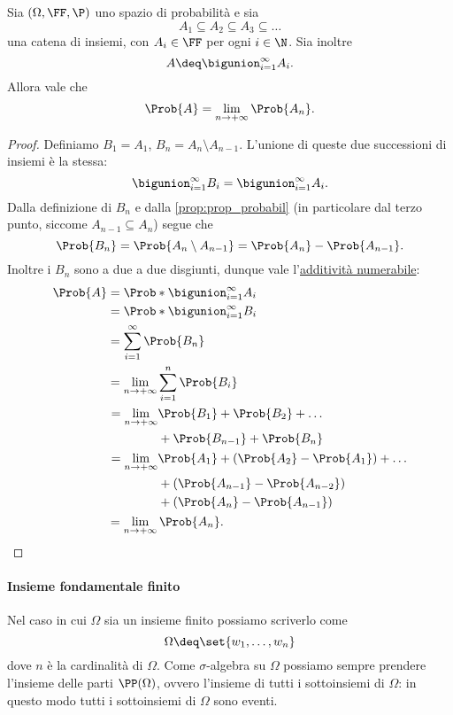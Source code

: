 \begin{proposition}
    Sia $(\Omega, \FF, \P)$ uno spazio di probabilità e sia \[
        A_1 \subseteq A_2 \subseteq A_3 \subseteq \dots    
    \] una catena di insiemi, con $A_i \in \FF$ per ogni $i \in \N$. Sia inoltre \[
        A \deq \bigunion_{i=1}^\infty A_i.    
    \] Allora vale che \begin{equation}
        \Prob{A} = \lim_{n \to +\infty} \Prob{A_n}.
    \end{equation}
\end{proposition}
\begin{proof}
    Definiamo $B_1 = A_1$, $B_n = A_n \setminus A_{n-1}$. L'unione di queste due successioni di insiemi è la stessa: \[
        \bigunion_{i=1}^\infty B_i = \bigunion_{i=1}^\infty A_i.    
    \] Dalla definizione di $B_n$ e dalla \autoref{prop:prop_probabil} (in particolare dal terzo punto, siccome $A_{n-1} \subseteq A_n$) segue che \[
        \Prob{B_n} = \Prob{A_n \setminus A_{n-1}} = \Prob{A_n} - \Prob{A_{n-1}}.
    \] Inoltre i $B_n$ sono a due a due disgiunti, dunque vale l'\hyperref[def:prob_numerab_add]{additività numerabile}: \begin{align*}
        \Prob{A} &= \Prob*{\bigunion_{i=1}^\infty A_i} \\
        &= \Prob*{\bigunion_{i=1}^\infty B_i}\\
        &= \sum_{i=1}^\infty \Prob{B_n}\\
        &= \lim_{n\to +\infty} \sum_{i=1}^n \Prob{B_i}\\
        &\begin{aligned}
            \ = \lim_{n \to +\infty} &\Prob{B_1} + \Prob{B_2} + \dots \\
            &+ \Prob{B_{n-1}} + \Prob{B_n}\\
        \end{aligned}\\
        &\begin{aligned}
            \ = \lim_{n \to +\infty} &\Prob{A_1} + (\Prob{A_2} - \Prob{A_1}) + \dots\\
            &+ (\Prob{A_{n-1}} - \Prob{A_{n-2}})\\
            &+ (\Prob{A_{n}} - \Prob{A_{n-1}})
        \end{aligned}\\
        &= \lim_{n \to +\infty} \Prob{A_n}. \qedhere
    \end{align*}
\end{proof}

\paragraph{Insieme fondamentale finito} Nel caso in cui $\Omega$ sia un insieme finito possiamo scriverlo come \[
    \Omega \deq \set{w_1, \dots, w_n}    
\] dove $n$ è la cardinalità di $\Omega$. Come $\sigma$-algebra su $\Omega$ possiamo sempre prendere l'insieme delle parti $\PP(\Omega)$, ovvero l'insieme di tutti i sottoinsiemi di $\Omega$: in questo modo tutti i sottoinsiemi di $\Omega$ sono eventi.

